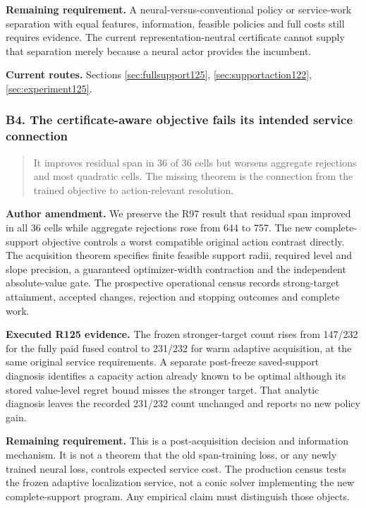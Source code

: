 \noindent\textbf{Remaining requirement.} A neural-versus-conventional policy or service-work separation with equal features, information, feasible policies and full costs still requires evidence. The current representation-neutral certificate cannot supply that separation merely because a neural actor provides the incumbent.

\noindent\textbf{Current routes.} Sections \ref{sec:fullsupport125}, \ref{sec:supportaction122}, \ref{sec:experiment125}.

\subsubsection{B4. The certificate-aware objective fails its intended service connection}

\begin{quote}\small
It improves residual span in 36 of 36 cells but worsens aggregate rejections and most quadratic cells. The missing theorem is the connection from the trained objective to action-relevant resolution.
\end{quote}

\noindent\textbf{Author amendment.} We preserve the R97 result that residual span improved in all 36 cells while aggregate rejections rose from 644 to 757. The new complete-support objective controls a worst compatible original action contrast directly. The acquisition theorem specifies finite feasible support radii, required level and slope precision, a guaranteed optimizer-width contraction and the independent absolute-value gate. The prospective operational census records strong-target attainment, accepted changes, rejection and stopping outcomes and complete work.

\noindent\textbf{Executed R125 evidence.} The frozen stronger-target count rises from 147/232 for the fully paid fused control to 231/232 for warm adaptive acquisition, at the same original service requirements. A separate post-freeze saved-support diagnosis identifies a capacity action already known to be optimal although its stored value-level regret bound misses the stronger target. That analytic diagnosis leaves the recorded 231/232 count unchanged and reports no new policy gain.

\noindent\textbf{Remaining requirement.} This is a post-acquisition decision and information mechanism. It is not a theorem that the old span-training loss, or any newly trained neural loss, controls expected service cost. The production census tests the frozen adaptive localization service, not a conic solver implementing the new complete-support program. Any empirical claim must distinguish those objects.

